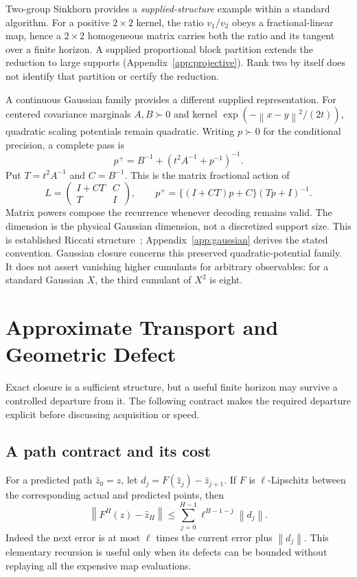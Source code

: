 \documentclass[journal]{IEEEtran}
\theoremstyle{definition}
\newcommand{\norm}[1]{\left\lVert#1\right\rVert}
\begin{document}
Two-group Sinkhorn provides a \emph{supplied-structure} example within a
standard algorithm. For a positive $2\times2$ kernel, the ratio $v_1/v_2$
obeys a fractional-linear map, hence a $2\times2$ homogeneous matrix carries
both the ratio and its tangent over a finite horizon. A supplied proportional
block partition extends the reduction to large supports
(Appendix~\ref{app:projective}). Rank two by itself does not identify that
partition or certify the reduction.

A continuous Gaussian family provides a different supplied representation.
For centered covariance marginals $A,B\succ0$ and kernel
$\exp(-\norm{x-y}^2/(2t))$, quadratic scaling potentials remain quadratic.
Writing $p\succ0$ for the conditional precision, a complete pass is
\begin{equation}
 p^+=B^{-1}+(t^2A^{-1}+p^{-1})^{-1}. \label{eq:gaussian}
\end{equation}
Put $T=t^2A^{-1}$ and $C=B^{-1}$. This is the matrix fractional action
of
\[
 L=\begin{pmatrix}I+CT&C\\T&I\end{pmatrix},\qquad
 p^+=\{(I+CT)p+C\}(Tp+I)^{-1}.
\]
Matrix powers compose the recurrence whenever decoding remains valid.
The dimension is the physical Gaussian dimension, not a discretized support
size. This is established Riccati structure~\cite{akyildiz,delmoralhorton};
Appendix~\ref{app:gaussian} derives the stated convention.
Gaussian closure concerns this preserved quadratic-potential family.
It does not assert vanishing higher cumulants for arbitrary observables:
for a standard Gaussian $X$, the third cumulant of $X^2$ is eight.

\section{Approximate Transport and Geometric Defect}
\label{sec:defects}
Exact closure is a sufficient structure, but a useful finite horizon may
survive a controlled departure from it. The following contract makes the
required departure explicit before discussing acquisition or speed.

\subsection{A path contract and its cost}
For a predicted path $\widehat z_0=z$, let
$d_j=F(\widehat z_j)-\widehat z_{j+1}$. If $F$ is $\ell$-Lipschitz between
the corresponding actual and predicted points, then
\begin{equation}
 \norm{F^H(z)-\widehat z_H}
 \leq\sum_{j=0}^{H-1}\ell^{H-1-j}\norm{d_j}.\label{eq:pathcontract}
\end{equation}
Indeed the next error is at most $\ell$ times the current error plus
$\norm{d_j}$. This elementary recursion is useful only when its defects
can be bounded without replaying all the expensive map evaluations.
\end{document}

